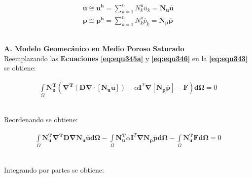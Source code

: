 \begin{ceqn} 
\begin{subequations} \label{eq:equ346} 
\begin{gather}
\mathbf{u} \cong \mathbf{u^h} = \displaystyle\sum_{k=1}^{n} N_{k}^{u} \overline{u}_k = \mathbf{N_u}\mathbf{\overline{u}}  \label{eq:equ346a}\\[12pt]
\mathbf{p} \cong \mathbf{p^h} = \displaystyle\sum_{k=1}^{n} N_{k}^{p} \overline{p}_k = \mathbf{N_p}\mathbf{\overline{p}}  \label{eq:equ346b}
\end{gather}  
\end{subequations} 
\end{ceqn}
\\
\textbf{A. Modelo Geomecánico en Medio Poroso Saturado}
\\
Reemplazando las \textbf{Ecuaciones} \textbf{\ref{eq:equ345a}} y \textbf{\ref{eq:equ346}} en la \textbf{\ref{eq:equ343}} se obtiene:

\begin{ceqn} %
\begin{gather}\label{eq:equ347}
\int\limits_\Omega \mathbf{N_{u}^T}\left(\mathbf{\nabla^T}(\mathbf{D}\mathbf{\nabla}\cdot[\mathbf{N_u}\mathbf{\overline{u}}])-\alpha\mathbf{I}^T\mathbf{\nabla}[\mathbf{N_p}\mathbf{\overline{p}}]-\mathbf{F}\right)\mathbf{d\Omega} = 0
\end{gather}   
\end{ceqn}
\\
Reordenando se obtiene:

\begin{ceqn} %
\begin{gather}\label{eq:equ348}
\int\limits_\Omega \mathbf{N_{u}^T}\mathbf{\nabla^T}\mathbf{D}\mathbf{\nabla}\mathbf{N_u}\mathbf{\overline{u}}\mathbf{d\Omega}  - \int\limits_\Omega \mathbf{N_{u}^T}\alpha\mathbf{I}^T\mathbf{\nabla}\mathbf{N_p}\mathbf{\overline{p}}\mathbf{d\Omega} - \int\limits_\Omega \mathbf{N_{u}^T}\mathbf{F}\mathbf{d\Omega} = 0
\end{gather}   
\end{ceqn}
\\
Integrando por partes se obtiene:

